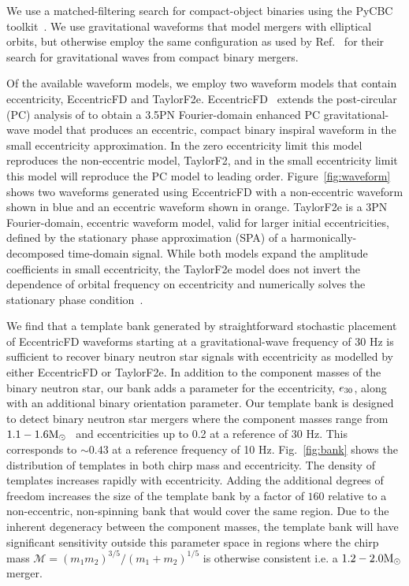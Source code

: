 We use a matched-filtering search for compact-object binaries using the PyCBC toolkit~\cite{pycbc-github}. We use gravitational waveforms that model mergers with elliptical orbits, but otherwise employ the same configuration as used by Ref.~\cite{Nitz:2018imz} for their search for gravitational waves from compact binary mergers.

Of the available waveform models, we employ two waveform models that contain eccentricity, EccentricFD and TaylorF2e. EccentricFD~\cite{Huerta:2014eca} extends the post-circular (PC) analysis of \cite{Yunes:2009yz} to obtain a 3.5PN Fourier-domain enhanced PC gravitational-wave model that produces an eccentric, compact binary inspiral waveform in the small eccentricity approximation.  In the zero eccentricity limit this model reproduces the non-eccentric model, TaylorF2, and in the small eccentricity limit this model will reproduce the PC model to leading order. Figure~\ref{fig:waveform} shows two waveforms generated using EccentricFD with a non-eccentric waveform shown in blue and an eccentric waveform shown in orange. TaylorF2e is a 3PN Fourier-domain, eccentric waveform model, valid for larger initial eccentricities, defined by the stationary phase approximation (SPA) of a harmonically-decomposed time-domain signal. While both models expand the amplitude coefficients in small eccentricity, the TaylorF2e model does not invert the dependence of orbital frequency on eccentricity and numerically solves the stationary phase condition~\cite{Moore:2018kvz,Moore:2019xkm,Moore:2019vjj}.

We find that a template bank generated by straightforward stochastic placement of EccentricFD waveforms starting at a gravitational-wave frequency of 30 Hz is sufficient to recover binary neutron star signals with eccentricity as modelled by either EccentricFD or TaylorF2e. In addition to the component masses of the binary neutron star, our bank adds a parameter for the eccentricity, $e_{30}$, along with an additional binary orientation parameter. Our template bank is designed to detect binary neutron star mergers where the component masses range from $1.1-1.6 \mathrm{M}_{\odot}$~\cite{Ozel:2016oaf} and eccentricities up to 0.2 at a reference of 30 Hz. This corresponds to $\sim0.43$ at a reference frequency of 10 Hz. Fig.~\ref{fig:bank} shows the distribution of templates in both chirp mass and eccentricity. The density of templates increases rapidly with eccentricity. Adding the additional degrees of freedom increases the size of the template bank by a factor of $160$ relative to a non-eccentric, non-spinning bank that would cover the same region. Due to the inherent degeneracy between the component masses, the template bank will have significant sensitivity outside this parameter space in regions where the chirp mass $\mathcal{M} = (m_1m_2)^{3/5} / (m_1+m_2)^{1/5}$ is otherwise consistent i.e. a $1.2 - 2.0\mathrm{M}_{\odot}$ merger. 

